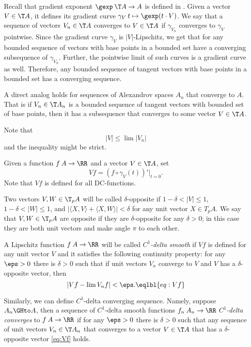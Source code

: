 Recall that gradient exponent $\gexp\: \T A\to A$ is defined in \cite{AKP}.
Given a vector $V\in \T A$, it defines its gradient curve $\gamma_{V}\:t\mapsto \gexp (t\cdot V)$.
We say that a sequence of vectors $V_n\in \T A$ converges to $V\in \T A$ if $\gamma_{V_n}$ converges to $\gamma_V$ pointwise.
Since the gradient curve $\gamma_V$ is $|V|$-Lipschitz, we get that for any bounded sequence of vectors with base points in a bounded set have a converging subsequence of $\gamma_{V_n}$.
Further, the pointwise limit of such curves is a gradient curve as well.
Therefore, any bounded sequence of tangent vectors with base points in a bounded set has a converging sequence.

A direct analog holds for sequences of Alexandrov spaces $A_n$ that converge to $A$.
That is if $V_n\in \T A_n$ is a bounded sequence of tangent vectors with bounded set of base points, then it has a subsequence that converges to some vector $V\in \T A$.

Note that 
\[|V|\le \lim |V_n|\]
and the inequality might be strict.




Given a function $f\:A\to \RR$ and a vector $V\in \T A$, set
\[Vf=(f\circ\gamma_V(t))'|_{t=0}.\]
Note that $Vf$ is defined for all DC-functions.

Two vectors $V,W\in \T_pA$ will be called $\delta$-opposite if
$1-\delta< |V|\le 1$,
$1-\delta< |W|\le 1$,
and $|\langle X,V\rangle +\langle X,W\rangle|<\delta$ for any unit vector $X\in T_p A$.
We say that $V,W\in \T_pA$ are opposite if they are $\delta$-opposite for any $\delta>0$;
in this case they are both unit vectors and make angle $\pi$ to each other.  

A Lipschitz function $f\:A\to \RR$ will be called \emph{$C^1$-delta smooth} if $Vf$ is defined for any unit vector $V$ and it satisfies the following continuity property:
for any $\eps>0$ there is $\delta>0$ such that if unit vectors $V_n$ converge to $V$ and $V$ has a $\delta$-opposite vector, then 
\[|Vf-\lim V_nf|<\eps.\eqlbl{eq:Vf}\]

Similarly, we can define $C^1$-delta converging sequence. Namely, suppose $A_n\GHto A$, then a sequence of $C^1$-delta smooth functions $f_n\:A_n\to\RR$ \emph{$C^1$-delta converges} to $f\:A\to \RR$ if for any $\eps>0$ there is $\delta>0$ such that any sequence of unit vectors $V_n\in \T A_n$ that converges to a vector $V\in \T A$ that has a $\delta$-opposite vector \ref{eq:Vf} holds. 

